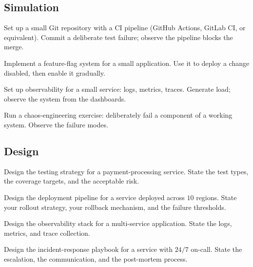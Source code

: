 \subsection*{Simulation}

\begin{exercise}
Set up a small Git repository with a CI pipeline (GitHub Actions, GitLab CI, or equivalent). Commit a deliberate test failure; observe the pipeline blocks the merge.
\end{exercise}

\begin{exercise}
Implement a feature-flag system for a small application. Use it to deploy a change disabled, then enable it gradually.
\end{exercise}

\begin{exercise}
Set up observability for a small service: logs, metrics, traces. Generate load; observe the system from the dashboards.
\end{exercise}

\begin{exercise}
Run a chaos-engineering exercise: deliberately fail a component of a working system. Observe the failure modes.
\end{exercise}

\subsection*{Design}

\begin{exercise}
Design the testing strategy for a payment-processing service. State the test types, the coverage targets, and the acceptable risk.
\end{exercise}

\begin{exercise}
Design the deployment pipeline for a service deployed across $10$ regions. State your rollout strategy, your rollback mechanism, and the failure thresholds.
\end{exercise}

\begin{exercise}
Design the observability stack for a multi-service application. State the logs, metrics, and trace collection.
\end{exercise}

\begin{exercise}
Design the incident-response playbook for a service with $24/7$ on-call. State the escalation, the communication, and the post-mortem process.
\end{exercise}

